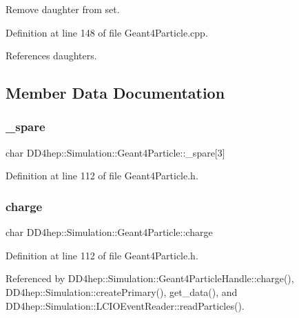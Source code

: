 Remove daughter from set. 



Definition at line 148 of file Geant4\+Particle.\+cpp.



References daughters.



\subsection{Member Data Documentation}
\hypertarget{class_d_d4hep_1_1_simulation_1_1_geant4_particle_abcd4d3e8d4b0c636deff9612e7d726d0}{}\label{class_d_d4hep_1_1_simulation_1_1_geant4_particle_abcd4d3e8d4b0c636deff9612e7d726d0} 
\subsubsection{\texorpdfstring{\+\_\+spare}{\_spare}}
{\footnotesize\ttfamily char D\+D4hep\+::\+Simulation\+::\+Geant4\+Particle\+::\+\_\+spare\mbox{[}3\mbox{]}}



Definition at line 112 of file Geant4\+Particle.\+h.

\hypertarget{class_d_d4hep_1_1_simulation_1_1_geant4_particle_a4c8f5bf9cfae6c1089554a86e8a752bc}{}\label{class_d_d4hep_1_1_simulation_1_1_geant4_particle_a4c8f5bf9cfae6c1089554a86e8a752bc} 
\subsubsection{\texorpdfstring{charge}{charge}}
{\footnotesize\ttfamily char D\+D4hep\+::\+Simulation\+::\+Geant4\+Particle\+::charge}



Definition at line 112 of file Geant4\+Particle.\+h.



Referenced by D\+D4hep\+::\+Simulation\+::\+Geant4\+Particle\+Handle\+::charge(), D\+D4hep\+::\+Simulation\+::create\+Primary(), get\+\_\+data(), and D\+D4hep\+::\+Simulation\+::\+L\+C\+I\+O\+Event\+Reader\+::read\+Particles().

